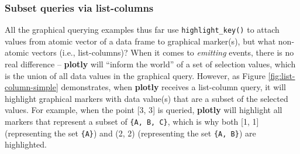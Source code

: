 \documentclass[
  12pt,
]{krantz}
\newenvironment{Shaded}{\begin{snugshade}}{\end{snugshade}}
\newcommand{\ControlFlowTok}[1]{\textcolor[rgb]{0.13,0.29,0.53}{\textbf{#1}}}
\newcommand{\DataTypeTok}[1]{\textcolor[rgb]{0.13,0.29,0.53}{#1}}
\newcommand{\DecValTok}[1]{\textcolor[rgb]{0.00,0.00,0.81}{#1}}
\newcommand{\KeywordTok}[1]{\textcolor[rgb]{0.13,0.29,0.53}{\textbf{#1}}}
\newcommand{\NormalTok}[1]{#1}
\newcommand{\OperatorTok}[1]{\textcolor[rgb]{0.81,0.36,0.00}{\textbf{#1}}}
\newcommand{\StringTok}[1]{\textcolor[rgb]{0.31,0.60,0.02}{#1}}
\begin{document}
\hypertarget{subset-queries-via-list-columns}{%
\subsubsection{Subset queries via list-columns}\label{subset-queries-via-list-columns}}

All the graphical querying examples thus far use \texttt{highlight\_key()} to attach values from atomic vector of a data frame to graphical marker(s), but what non-atomic vectors (i.e., list-columns)? When it comes to \emph{emitting} events, there is no real difference -- \textbf{plotly} will ``inform the world'' of a set of selection values, which is the union of all data values in the graphical query. However, as Figure \ref{fig:list-column-simple} demonstrates, when \textbf{plotly} receives a list-column query, it will highlight graphical markers with data value(s) that are a subset of the selected values. For example, when the point {[}3, 3{]} is queried, \textbf{plotly} will highlight all markers that represent a subset of \texttt{\{A,\ B,\ C\}}, which is why both {[}1, 1{]} (representing the set \texttt{\{A\}}) and (2, 2) (representing the set \texttt{\{A,\ B\}}) are highlighted.

\begin{Shaded}
\end{Shaded}
\end{document}
